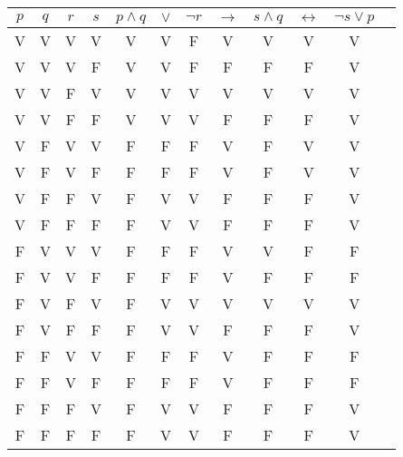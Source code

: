 \documentclass{report}%
\begin{document}
\begin{tabular}{|c|c|c|c|c|c|c|c|c|c|c|c|} \hline
$p$ & $q$ & $r$ & $s$ & $p\wedge q$ & $\vee$ & $\neg r$ & $\rightarrow$ & $s\wedge q$ & $\leftrightarrow$ & $\neg s \vee p$ \\ \hline
V & V & V & V & V & V & F & V & V & V & V \\ \hline
V & V & V & F & V & V & F & F & F & F & V \\ \hline 
V & V & F & V & V & V & V & V & V & V & V \\ \hline
V & V & F & F & V & V & V & F & F & F & V \\ \hline
V & F & V & V & F & F & F & V & F & V & V \\ \hline
V & F & V & F & F & F & F & V & F & V & V \\ \hline
V & F & F & V & F & V & V & F & F & F & V \\ \hline
V & F & F & F & F & V & V & F & F & F & V \\ \hline
F & V & V & V & F & F & F & V & V & F & F \\ \hline
F & V & V & F & F & F & F & V & F & F & F \\ \hline
F & V & F & V & F & V & V & V & V & V & V \\ \hline
F & V & F & F & F & V & V & F & F & F & V \\ \hline
F & F & V & V & F & F & F & V & F & F & F \\ \hline
F & F & V & F & F & F & F & V & F & F & F \\ \hline
F & F & F & V & F & V & V & F & F & F & V \\ \hline
F & F & F & F & F & V & V & F & F & F & V \\ \hline

\end{tabular}
\end{document}
